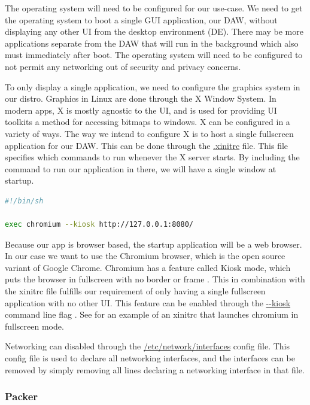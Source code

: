 The operating system will need to be configured for our use-case. We need to get the
operating system to boot a single GUI application, our DAW, without displaying any other
UI from the desktop environment (DE). There may be more applications separate from the DAW
that will run in the background which also must  immediately after boot. The
operating system will need to be configured to not permit any networking out of security
and privacy concerns.

To only display a single application, we need to configure the graphics system in our
distro. Graphics in Linux are done through the X Window System. In modern apps, X is
mostly agnostic to the UI, and is used for providing UI toolkits a method for accessing
bitmaps to windows. X can be configured in a variety of ways. The way we intend to
configure X is to host a single fullscreen application for our DAW. This can be done
through the \url{.xinitrc} file. This file specifies which commands to run whenever the X
server starts. By including the command to run our application in there, we will have a
single window at startup.

\begin{lstlisting}[language=bash, label={lst:xinitrc}, caption=Example .xinitrc]
#!/bin/sh

exec chromium --kiosk http://127.0.0.1:8080/
\end{lstlisting}

Because our app is browser based, the startup application will be a web browser. In our
case we want to use the Chromium browser, which is the open source variant of Google
Chrome. Chromium has a feature called Kiosk mode, which puts the browser in fullscreen
with no border or frame \autocite{chromiumKioskMode}. This in combination with the xinitrc
file fulfills our requirement of only having a single fullscreen application with no other
UI. This feature can be enabled through the \url{--kiosk} command line flag
\autocite{chromiumKioskMode}. See  for an example of an xinitrc that
launches chromium in fullscreen mode.

Networking can disabled through the \url{/etc/network/interfaces} config file. This config
file is used to declare all networking interfaces, and the interfaces can be removed by
simply removing all lines declaring a networking interface in that file.

\subsubsection{Packer}
\label{sec:packer}


